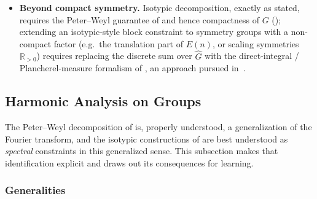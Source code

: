 \documentclass[mathematics,review,submit,moreauthors]{Definitions/mdpi}
\begin{document}
\begin{Example}
\begin{itemize}
    network of the same width---is the subject of the universal
    approximation analysis in~\citep{yarotsky2018r}.
    \item \textbf{Beyond compact symmetry.} Isotypic decomposition, exactly
    as stated, requires the Peter--Weyl guarantee of
     and hence compactness of $G$
    (); extending an isotypic-style
    block constraint to symmetry groups with a non-compact factor (e.g.\ the
    translation part of $E(n)$, or scaling symmetries
    $\mathbb{R}_{>0}$) requires replacing the discrete sum over
    $\widehat{G}$ with the direct-integral / Plancherel-measure formalism
    of , an approach pursued
    in~\citep{gibson2024}.
\end{itemize}
\end{Example}

\subsection{Harmonic Analysis on Groups}
\label{subsec:harmonic-analysis}

The Peter--Weyl decomposition of  is, properly
understood, a generalization of the Fourier transform, and the isotypic
constructions of  are best understood
as \emph{spectral} constraints in this generalized sense. This subsection
makes that identification explicit and draws out its consequences for
learning.

\subsubsection{Generalities}
\label{subsubsec:harmonic-analysis-generalities}
\end{document}
